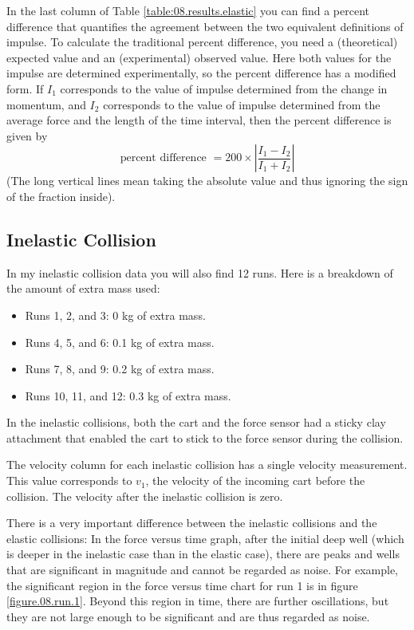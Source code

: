 In the last column of Table \ref{table:08.results.elastic} you can find a percent difference that quantifies the agreement between the two equivalent definitions of impulse. To calculate the traditional percent difference, you need a (theoretical) expected value and an (experimental) observed value. Here both values for the impulse are determined experimentally, so the percent difference has a modified form. If $I_{1}$ corresponds to the value of impulse determined from the change in momentum, and $I_{2}$ corresponds to the value of impulse determined from the average force and the length of the time interval, then the percent difference is given by
\begin{equation}
    \text{percent difference } = 200 \times \left\vert \frac{I_{1} - I_{2}}{I_{1} + I_{2}} \right\vert
\end{equation}
(The long vertical lines mean taking the absolute value and thus ignoring the sign of the fraction inside).
\subsection{Inelastic Collision}
In my inelastic collision data you will also find 12 runs. Here is a breakdown of the amount of extra mass used:
\begin{itemize}
    \item Runs 1, 2, and 3: 0 kg of extra mass.
    \item Runs 4, 5, and 6: 0.1 kg of extra mass.
    \item Runs 7, 8, and 9: 0.2 kg of extra mass.
    \item Runs 10, 11, and 12: 0.3 kg of extra mass.
\end{itemize}
In the inelastic collisions, both the cart and the force sensor had a sticky clay attachment that enabled the cart to stick to the force sensor during the collision.

The velocity column for each inelastic collision has a single velocity measurement. This value corresponds to $v_{1}$, the velocity of the incoming cart before the collision. The velocity after the inelastic collision is zero.

There is a very important difference between the inelastic collisions and the elastic collisions: In the force versus time graph, after the initial deep well (which is deeper in the inelastic case than in the elastic case), there are peaks and wells that are significant in magnitude and cannot be regarded as noise. For example, the significant region in the force versus time chart for run 1 is in figure \ref{figure.08.run.1}. Beyond this region in time, there are further oscillations, but they are not large enough to be significant and are thus regarded as noise.

